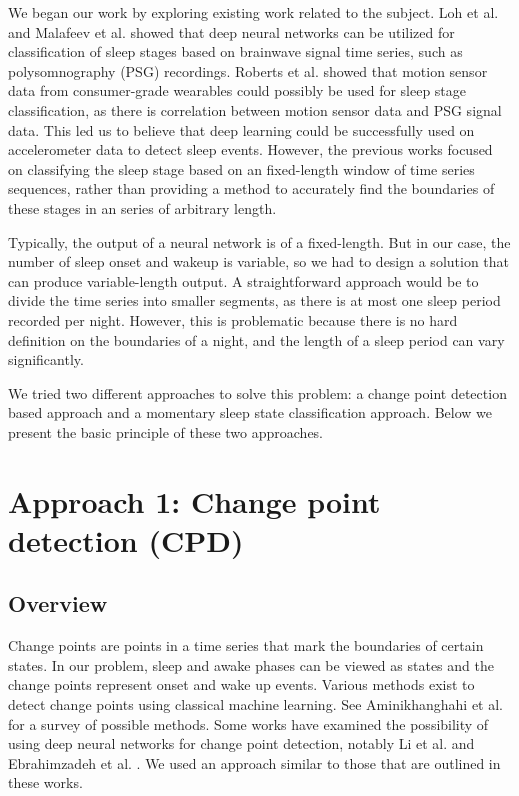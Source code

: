 \documentclass{article}
\begin{document}
We began our work by exploring existing work related to the subject. Loh et al. \cite{sleep1} and Malafeev et al. \cite{sleep3} showed that deep neural networks can be utilized for classification of sleep stages based on brainwave signal time series, such as polysomnography (PSG) recordings. Roberts et al. \cite{sleep2} showed that motion sensor data from consumer-grade wearables could possibly be used for sleep stage classification, as there is correlation between motion sensor data and PSG signal data. This led us to believe that deep learning could be successfully used on accelerometer data to detect sleep events. However, the previous works focused on classifying the sleep stage based on an fixed-length window of time series sequences, rather than providing a method to accurately find the boundaries of these stages in an series of arbitrary length.

Typically, the output of a neural network is of a fixed-length. But in our case, the number of sleep onset and wakeup is variable, so we had to design a solution that can produce variable-length output. A straightforward approach would be to divide the time series into smaller segments, as there is at most one sleep period recorded per night. However, this is problematic because there is no hard definition on the boundaries of a night, and the length of a sleep period can vary significantly.

We tried two different approaches to solve this problem: a change point detection based approach and a momentary sleep state classification approach. Below we present the basic principle of these two approaches.

\section{Approach 1: Change point detection (CPD)}

\subsection{Overview}

Change points are points in a time series that mark the boundaries of certain states. In our problem, sleep and awake phases can be viewed as states and the change points represent onset and wake up events. Various methods exist to detect change points using classical machine learning. See Aminikhanghahi et al. \cite{aminikhanghahi17} for a survey of possible methods. Some works have examined the possibility of using deep neural networks for change point detection, notably Li et al. \cite{li2022automatic} and Ebrahimzadeh et al. \cite{multicpd}. We used an approach similar to those that are outlined in these works.
\end{document}
